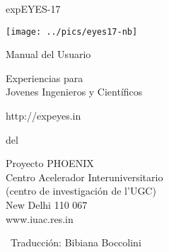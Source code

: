 \documentclass[12pt,a4paper]{report}
\begin{document}
\begin{titlepage}
\thispagestyle{empty}

\vspace{0.2in}

\begin{center}
{\Huge{}expEYES-17}
\par\end{center}{\Huge \par}

\begin{center}
\texttt{[image: ../pics/eyes17-nb]}
\par\end{center}

\begin{center}
{\large{}Manual del Usuario}
\par\end{center}{\large \par}

\begin{center}
{\LARGE{}Experiencias para}\\
{\LARGE{}Jovenes Ingenieros y Científicos}
\par\end{center}{\LARGE \par}

\begin{center}
http://expeyes.in
\par\end{center}

\begin{center}
del
\par\end{center}

\begin{center}
Proyecto PHOENIX\\
Centro Acelerador Interuniversitario \\
(centro de investigación de l'UGC)\\
New Delhi 110 067\\
www.iuac.res.in
\par\end{center}

\vfill

{~\hfill \small Traducción: Bibiana Boccolini}

\end{titlepage}
\end{document}
